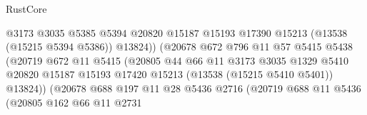 \begin{lexlean}{RustCore}
\begin{coremodule}
                                          @3173
                                          @3035
                                          @5385
                                          @5394
                                          @20820
                                          @15187
                                          @15193
                                          @17390
                                          @15213
                                          (@13538 (@15215 @5394 @5386))
                                          @13824))
                                      (@20678
                                        @672
                                        @796
                                        @11
                                        @57
                                        @5415
                                        @5438
                                        (@20719
                                          @672
                                          @11
                                          @5415
                                          (@20805
                                            @44
                                            @66
                                            @11
                                            @3173
                                            @3035
                                            @1329
                                            @5410
                                            @20820
                                            @15187
                                            @15193
                                            @17420
                                            @15213
                                            (@13538 (@15215 @5410 @5401))
                                            @13824))
                                        (@20678
                                          @688
                                          @197
                                          @11
                                          @28
                                          @5436
                                          @2716
                                          (@20719
                                            @688
                                            @11
                                            @5436
                                            (@20805
                                              @162
                                              @66
                                              @11
                                              @2731

\end{coremodule}
\end{lexlean}
